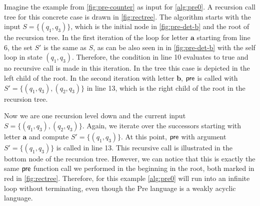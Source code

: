 %


Imagine the example from \autoref{fig:pre-counter} as input for \autoref{alg:pre0}. A recursion call tree for this concrete case is drawn in \autoref{fig:rectree}.
The algorithm starts with the input $S=\{(q_{1},q_{3})\}$, which is the initial node in \autoref{fig:pre-det-b} and the root of the recursion tree. In the first iteration of the loop for letter $\bm{a}$ starting from line 6, the set $S'$ is the same as $S$, as can be also seen in in \autoref{fig:pre-det-b} with the self loop in state $(q_{1},q_{3})$. Therefore, the condition in line 10 evaluates to true and no recursive call is made in this iteration. In the tree this case is depicted in the left child of the root. 
In the second iteration with letter $\bm{b}$, $\operatorname{\textsf{pre}}$ is called with $S'= \{(q_{1},q_{3}),(q_{2},q_{3})\}$ in line 13, which is the right child of the root in the recursion tree. 
\par
Now we are one recursion level down and the current input $S=\{(q_{1},q_{3}),(q_{2},q_{3})\}$. Again, we iterate over the successors starting with letter $\bm{a}$ and compute $S'=\{(q_{1},q_{3})\}$. At this point, $\operatorname{\textsf{pre}}$ with argument $S'=\{(q_{1},q_{3})\}$ is called in line 13. This recursive call is illustrated in the bottom node of the recursion tree. However, we can notice that this is exactly the same $\operatorname{\textsf{pre}}$ function call we performed in the beginning in the root, both marked in red in \autoref{fig:rectree}. Therefore, for this example \autoref{alg:pre0} will run into an infinite loop without terminating, even though the Pre language is a weakly acyclic language.


%



